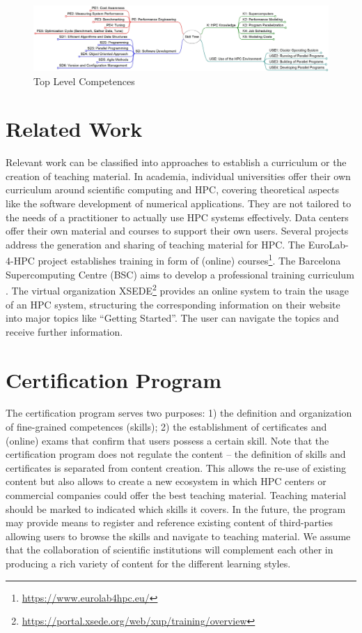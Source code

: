 \documentclass[jocse]{jocseart}
\begin{document}
\begin{figure}[tb!]
	\centering
	\includegraphics[width=15.0cm]{skill-tree_top_levels.jpg}
  \vspace*{-2em}
	\caption{Top Level Competences}
	\label{f_top_level_competences}
\end{figure}

\section{Related Work}

Relevant work can be classified into approaches to establish a curriculum or the creation of teaching material.
In academia, individual universities offer their own curriculum around scientific computing and HPC, covering theoretical aspects like the software development of numerical applications.
They are not tailored to the needs of a practitioner to actually use HPC systems effectively.
Data centers offer their own material and courses to support their own users.
Several projects address the generation and sharing of teaching material for HPC.
The EuroLab-4-HPC project establishes training in form of (online) courses\footnote{\url{https://www.eurolab4hpc.eu/}}.
The Barcelona Supercomputing Centre (BSC) aims to develop a professional training curriculum \cite{sancho2016bsc}.
The virtual organization XSEDE\footnote{\url{https://portal.xsede.org/web/xup/training/overview}} provides an online system to train the usage of an HPC system, structuring the corresponding information on their website into major topics like “Getting Started”.
The user can navigate the topics and receive further information.






\section{Certification Program}

The certification program serves two purposes:
1) the definition and organization of fine-grained competences (skills);
2) the establishment of certificates and (online) exams that confirm that users possess a certain skill.
Note that the certification program does not regulate the content -- the definition of skills and certificates is separated from content creation.
This allows the re-use of existing content but also allows to create a new ecosystem in which HPC centers or commercial companies could offer the best teaching material.
Teaching material should be marked to indicated which skills it covers.
In the future, the program may provide means to register and reference existing content of third-parties allowing users to browse the skills and navigate to teaching material.
We assume that the collaboration of scientific institutions will complement each other in producing a rich variety of content for the different learning styles.
\end{document}
